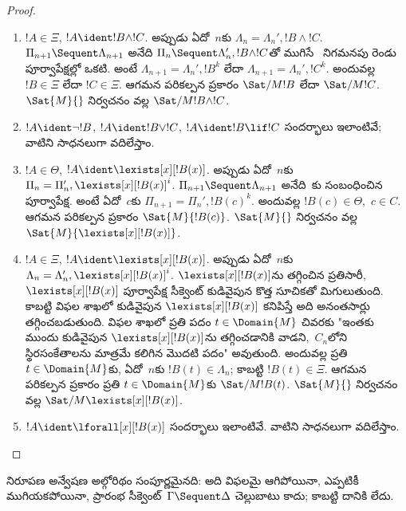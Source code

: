 \documentclass[../../../include/open-logic-section]{subfiles}
\begin{document}
\begin{proof}
\begin{enumerate}
  \item $!A \in \Xi$, $!A \ident !B \land !C$. అప్పుడు ఏదో~$n$కు $\Lambda_n = \Lambda_n', !B \land !C$. $\Pi_{n+1} \Sequent
  \Lambda_{n+1}$ అనేది $\Pi_n \Sequent \Lambda'_n, !B \land !C$తో ముగిసే~\RightR{\land} నిగమనపు రెండు పూర్వాపేక్షల్లో ఒకటి. అంటే $\Lambda_{n+1} = \Lambda_n', !B^k$ లేదా $\Lambda_{n+1} = \Lambda_n',
  !C^k$. అందువల్ల $!B \in \Xi$ లేదా $!C \in \Xi$. ఆగమన పరికల్పన ప్రకారం $\Sat/{M}{!B}$ లేదా $\Sat/{M}{!C}$. $\Sat{M}{}$ నిర్వచనం వల్ల $\Sat/{M}{!B \land !C}$.

  \item $!A \ident \lnot !B$, $!A \ident !B \lor !C$, $!A \ident !B \lif !C$ సందర్భాలు ఇలాంటివే; వాటిని సాధనలుగా వదిలేస్తాం.

  \item $!A \in \Theta$, $!A \ident \lexists[x][!B(x)]$. అప్పుడు ఏదో~$n$కు $\Pi_n = \Pi_n', \lexists[x][!B(x)]^i$. $\Pi_{n+1}
  \Sequent \Lambda_{n+1}$ అనేది~\LeftR{\lexists}కు సంబంధించిన పూర్వాపేక్ష. అంటే ఏదో~$c$కు $\Pi_{n+1} = \Pi_n', !B(c)^k$. అందువల్ల $!B(c) \in \Theta$,~$c \in C$. ఆగమన పరికల్పన ప్రకారం $\Sat{M}{!B(c)}$. $\Sat{M}{}$ నిర్వచనం వల్ల $\Sat{M}{\lexists[x][!B(x)]}$.

  \item $!A \in \Xi$, $!A \ident \lexists[x][!B(x)]$. అప్పుడు ఏదో~$n$కు $\Lambda_n = \Lambda_n', \lexists[x][!B(x)]^i$. $\lexists[x][!B(x)]$ను తగ్గించిన ప్రతిసారీ, $\lexists[x][!B(x)]$ పూర్వాపేక్ష సీక్వెంట్ కుడివైపున కొత్త సూచికతో మిగులుతుంది. కాబట్టి విఫల శాఖలో కుడివైపున $\lexists[x][!B(x)]$ కనిపిస్తే అది అనంతసార్లు తగ్గించబడుతుంది. విఫల శాఖలో ప్రతి పదం $t \in
  \Domain{M}$ చివరకు "ఇంతకు ముందు కుడివైపున $\lexists[x][!B(x)]$ను తగ్గించడానికి వాడని,~$C_n$లోని స్థిరసంకేతాలను మాత్రమే కలిగిన మొదటి పదం" అవుతుంది. అందువల్ల ప్రతి $t \in \Domain{M}$కు, ఏదో~$n$కు $!B(t) \in \Lambda_n$; కాబట్టి $!B(t) \in \Xi$. ఆగమన పరికల్పన ప్రకారం ప్రతి $t \in
  \Domain{M}$కు $\Sat/{M}{!B(t)}$. $\Sat{M}{}$ నిర్వచనం వల్ల $\Sat/{M}{\lexists[x][!B(x)]}$.

  \item $!A \ident \lforall[x][!B(x)]$ సందర్భాలు ఇలాంటివే. వాటిని సాధనలుగా వదిలేస్తాం.
\end{enumerate}
\end{proof}

\begin{cor}  నిరూపణ అన్వేషణ అల్గోరిథం సంపూర్ణమైనది: అది విఫలమై ఆగిపోయినా, ఎప్పటికీ ముగియకపోయినా, ప్రారంభ సీక్వెంట్~$\Gamma \Sequent \Delta$ చెల్లుబాటు కాదు; కాబట్టి దానికి  లేదు.
\end{cor}
\end{document}
